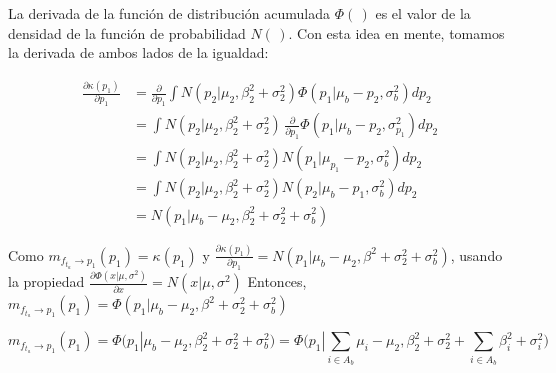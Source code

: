 \documentclass[11pt,twoside,spanish]{report} %
\begin{document}
La derivada de la funci\'on de distribuci\'on acumulada $\Phi(\,)$ es el valor de la densidad de la funci\'on de probabilidad $N(\,)$. Con esta idea en mente, tomamos la derivada de ambos lados de la igualdad:

\begin{equation}\label{eq:ta-p_derivada}
	\begin{split}
		\frac{\partial\kappa(p_1)}{\partial p_1} &= \frac{\partial}{\partial p_1} \int  N(p_2| \mu_{2}, \beta_2^2 + \sigma_{2}^2 )    \Phi (p_1 | \mu_b -p_2 ,  \sigma_{b}^2 )  dp_2 \\
		&= \int  N(p_2| \mu_2,\beta_2^2 + \sigma_2^2 ) \, \frac{\partial}{\partial p_1} \Phi (p_1| \mu_{b} - p_2, \sigma_{p_1}^2 )   dp_2   \\
		&= \int  N(p_2| \mu_{2}, \beta_2^2 +\sigma_{2}^2 )  N(p_1| \mu_{p_1} -p_2 , \sigma_b^2)   dp_2  \\
		& = \int  N(p_2| \mu_{2}, \beta_2^2 +\sigma_2^2 )  N(p_2| \mu_{b}  -p_1 , \sigma_b^2)   dp_2  \\
		&= N(p_1| \mu_{b} - \mu_{2}, \beta_2^2+\sigma_2^2 + \sigma_{b}^2)
	\end{split}
\end{equation}

Como $m_{f_{t_a} \rightarrow p_1}(p_1) = \kappa(p_1)$ y $\frac{\partial\kappa(p_1)}{\partial p_1}=  N(p_1| \mu_{b} - \mu_{2}, \beta^2+\sigma_2^2 + \sigma_{b}^2)$, usando la propiedad $\frac{\partial\Phi(x| \mu, \sigma^2)}{\partial x}=N(x| \mu, \sigma^2)$ Entonces, $m_{f_{t_a} \rightarrow p_1}(p_1) = \Phi(p_1| \mu_b - \mu_2, \beta^2 + \sigma_2^2 + \sigma_b^2)$

\begin{equation}
	m_{f_{t_a} \rightarrow p_1}(p_1) =  \Phi(p_1| \mu_b - \mu_2, \beta_2^2 + \sigma_2^2 + \sigma_b^2) =  \Phi\Big(p_1| \sum_{i \in A_b} \mu_i - \mu_2, \beta_2^2 + \sigma_2^2 + \sum_{i \in A_b} \beta_i^2 + \sigma_i^2 \Big)
\end{equation}
\end{document}
